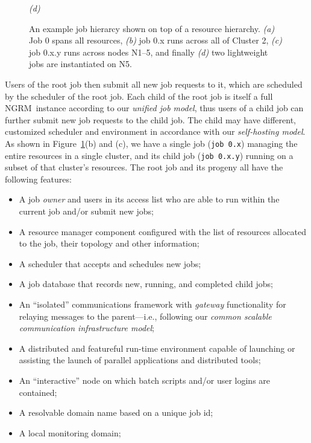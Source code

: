 \documentclass[10pt]{article}
\newcommand{\ngrm}{NGRM}
\begin{document}
\begin{figure}
\begin{minipage}{0.5\linewidth}
\begin{center}
  {\em (d)}
  \end{center}
\end{minipage}
\label{fig:JobHierarchy}
\caption[Job Hierarchy Example]{{\small An example job hierarcy shown on top
of a resource hierarchy.
{\em (a)} Job 0 spans all resources,
{\em (b)} job 0.x runs across all of {\sc Cluster 2},
{\em (c)} job 0.x.y runs across nodes N1--5, and finally
{\em (d)} two lightweight jobs are instantiated on N5.}}
\end{figure}

Users of the root job then submit all new job requests to it, which are scheduled
by the scheduler of the root job. 
Each child of the root job is itself a full \ngrm\ instance according to 
our {\em unified job model}, thus users of a child job can further submit new job requests 
to the child job. The child may have different, customized scheduler and environment 
in accordance with our {\em self-hosting model}.
As shown in Figure~\ref{fig:JobHierarchy}(b) and (c),
we have a single job ({\tt job 0.x}) managing the entire resources in a single cluster, 
and its child job ({\tt job 0.x.y}) running on a subset of that cluster's resources.
The root job and its progeny all have the following features:
\begin{itemize}
\item{A job {\em owner} and users in its access list who are able to run
      within the current job and/or submit new jobs;}
\item{A resource manager component configured with the list of
      resources allocated to the job, their topology and other information;}
\item{A scheduler that accepts and schedules new jobs;}
\item{A job database that records new, running, and completed child jobs;}
\item{An ``isolated'' communications framework with {\em gateway} functionality
      for relaying messages to the parent---i.e., following our {\em common scalable communication infrastructure model};}
\item{A distributed and featureful run-time environment capable of launching
      or assisting the launch of parallel applications and distributed tools;}
\item{An ``interactive'' node on which batch scripts and/or user logins
       are contained;}
\item{A resolvable domain name based on a unique job id;}
\item{A local monitoring domain;}
\end{itemize}
\end{document}
